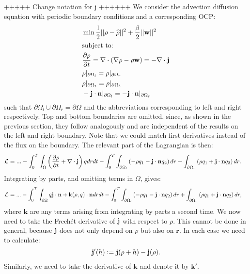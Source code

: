 +++++ Change notation for j ++++++
	We consider the advection diffusion equation with periodic boundary conditions and a corresponding OCP:
	\begin{align*}
		&\min \frac{1}{2}|| \rho - \widehat \rho||^2 + \frac{\beta}{2}||\mathbf{w}||^2\\
		&\text{subject to:}\\
		&\frac{\partial \rho}{\partial t} = \nabla \cdot \left(\nabla \rho - \rho \mathbf{w}\right) = -\nabla \cdot \mathbf j\\
		& \rho|_{\partial \Omega_l} = \rho|_{\partial \Omega_r}\\
		& \rho|_{\partial \Omega_t} = \rho|_{\partial \Omega_b}\\
		& - \mathbf j \cdot \mathbf{n} |_{\partial \Omega_l}= - \mathbf j \cdot \mathbf{n}|_{\partial \Omega_r}
	\end{align*}
	such that $\partial\Omega_l \cup \partial\Omega_r = \partial \Omega$ and the abbreviations corresponding to left and right respectively. Top and bottom boundaries are omitted, since, as shown in the previous section, they follow analogously and are independent of the results on the left and right boundary. Note that we could match first derivatives instead of the flux on the boundary.
	The relevant part of the Lagrangian is then:
	\begin{align*}
		\mathcal{L} &= ... -\int_0^T \int_\Omega \left(\frac{\partial \rho}{\partial t} + \nabla \cdot \mathbf j\right)q dr dt - \int_0^T \int_{\partial \Omega_l} \left(- \rho q_1 - \mathbf j \cdot \mathbf{n} q_2 \right) dr  + \int_{\partial \Omega_r} \left(\rho q_1 +  \mathbf j \cdot \mathbf{n} q_2  \right)  dr .
	\end{align*}
	Integrating by parts, and omitting terms in $\Omega$, gives:
	\begin{align*}
		\mathcal{L} &= ... - \int_0^T \int_{\partial \Omega} q \mathbf j  \cdot \mathbf{n} + \mathbf{k}(\rho, q) \cdot \mathbf{n}  dr dt - \int_0^T \int_{\partial \Omega_l} \left(- \rho q_1 - \mathbf j \cdot \mathbf{n} q_2 \right)   dr  + \int_{\partial \Omega_r} \left(\rho q_1 + \mathbf j \cdot \mathbf{n} q_2 \right)   dr, 
	\end{align*}
	where $\mathbf{k}$ are any terms arising from integrating by parts a second time.
	We now need to take the Frech\'et derivative of $\mathbf j$ with respect to $\rho$. This cannot be done in general, because $\mathbf j$ does not only depend on $\rho$ but also on $\mathbf r$. In each case we need to calculate:
	\begin{align*}
		\mathbf j'(h) := \mathbf j (\rho + h) - \mathbf j (\rho).
	\end{align*}
	Similarly, we need to take the derivative of $\mathbf k$ and denote it by $\mathbf{k}'$.
